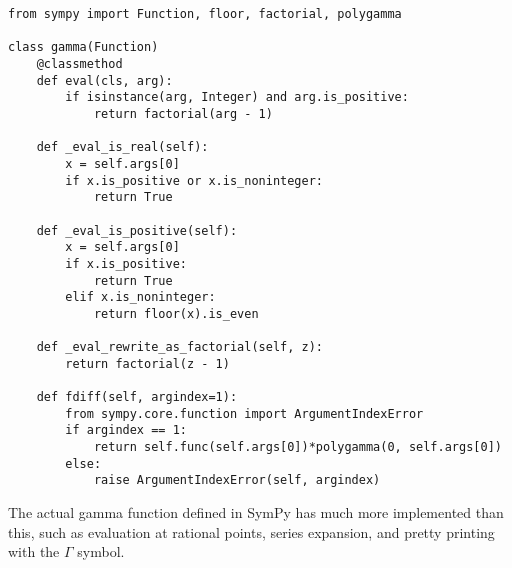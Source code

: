 \begin{verbatim}
from sympy import Function, floor, factorial, polygamma

class gamma(Function)
    @classmethod
    def eval(cls, arg):
        if isinstance(arg, Integer) and arg.is_positive:
            return factorial(arg - 1)

    def _eval_is_real(self):
        x = self.args[0]
        if x.is_positive or x.is_noninteger:
            return True

    def _eval_is_positive(self):
        x = self.args[0]
        if x.is_positive:
            return True
        elif x.is_noninteger:
            return floor(x).is_even

    def _eval_rewrite_as_factorial(self, z):
        return factorial(z - 1)

    def fdiff(self, argindex=1):
        from sympy.core.function import ArgumentIndexError
        if argindex == 1:
            return self.func(self.args[0])*polygamma(0, self.args[0])
        else:
            raise ArgumentIndexError(self, argindex)
\end{verbatim}

The actual gamma function defined in SymPy has much more implemented than
this, such as evaluation at rational points, series expansion, and pretty
printing with the $\Gamma$ symbol.
